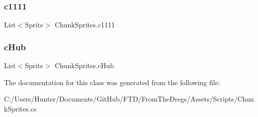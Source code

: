 \subsubsection{\texorpdfstring{c1111}{c1111}}
{\footnotesize\ttfamily List$<$Sprite$>$ Chunk\+Sprites.\+c1111}

\mbox{\label{class_chunk_sprites_ad3790f456c356fe27f3da510f399f6a9}} 
\subsubsection{\texorpdfstring{cHub}{cHub}}
{\footnotesize\ttfamily List$<$Sprite$>$ Chunk\+Sprites.\+c\+Hub}



The documentation for this class was generated from the following file\+:\begin{DoxyCompactItemize}
\item 
C\+:/\+Users/\+Hunter/\+Documents/\+Git\+Hub/\+F\+T\+D/\+From\+The\+Dregs/\+Assets/\+Scripts/Chunk\+Sprites.\+cs\end{DoxyCompactItemize}

